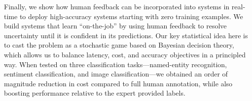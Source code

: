 Finally, we show how human feedback can be incorporated into systems in real-time to deploy high-accuracy systems starting with zero training examples.
We build systems that learn ``on-the-job'' by using human feedback to resolve uncertainty until it is confident in its predictions.
Our key statistical  idea here is to cast the problem as a stochastic game based on Bayesian decision theory, which allows us to balance latency, cost, and accuracy objectives in a principled way.
When tested on three classification tasks---named-entity recognition, sentiment classification, and image classification---we obtained an order of magnitude reduction in cost compared to full human annotation, while also boosting performance relative to the expert provided labels.
